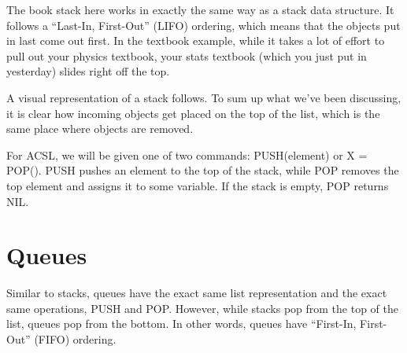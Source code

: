 \documentclass{pset_template}
\begin{document}
The book stack here works in exactly the same way as a stack data structure.
It follows a ``Last-In, First-Out'' (LIFO) ordering, which means that the objects
put in last come out first.
In the textbook example, while it takes a lot of effort to pull out your physics textbook,
your stats textbook (which you just put in yesterday) slides right off the top.

A visual representation of a stack follows.
To sum up what we've been discussing, it is clear how incoming objects
get placed on the top of the list, which is the same place where
objects are removed.
\begin{center}
\end{center}

For ACSL, we will be given one of two commands: PUSH(element) or X = POP().
PUSH pushes an element to the top of the stack, while POP removes the top element
and assigns it to some variable.
If the stack is empty, POP returns NIL\@.

\section{Queues}
Similar to stacks, queues have the exact same list representation and the exact
same operations, PUSH and POP\@.
However, while stacks pop from the top of the list, queues pop from the bottom.
In other words, queues have ``First-In, First-Out'' (FIFO) ordering.
\end{document}
